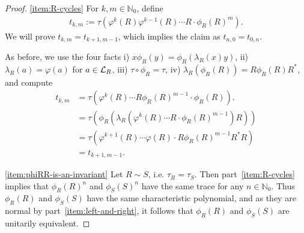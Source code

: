 \documentclass[12pt,a4paper]{amsart}
\numberwithin{equation}{section}
\theoremstyle{remark}
\newcommand{\Nl}{\mathbb{N}}
\newcommand{\la}{\lambda}
\begin{document}
\begin{proof}
     \ref{item:R-cycles} For $k,m\in\Nl_0$, define 
 \begin{align}
  t_{k,m}
  :=
  \tau(\varphi^k(R)\varphi^{k-1}(R)\cdots R\cdot\phi_R(R)^m).
 \end{align}
 We will prove $t_{k,m}=t_{k+1,m-1}$, which implies the claim as $t_{n,0}=t_{0,n}$.
 
As before, we use the four facts i) $x\phi_R(y)=\phi_R(\la_R(x)y)$, ii) $\la_R(a)=\varphi(a)$ for $a\in\mathcal{L}_R$, iii) $\tau\circ\phi_R=\tau$, iv) $\la_R(\phi_R(R))=R\phi_R(R)R^*$, and compute
 \begin{align*}
  t_{k,m}
  &=
  \tau(\varphi^k(R)\cdots R\phi_R(R)^{m-1}\cdot\phi_R(R)).
  \\
  &=
  \tau\left(\phi_R\left(\la_R\left(\varphi^k(R)\cdots R\cdot\phi_R(R)^{m-1}\right)R\right)\right)    
  \\
  &=
  \tau\left(\varphi^{k+1}(R)\cdots \varphi(R)\cdot R\phi_R(R)^{m-1}R^*R\right)    
  \\
  &=
  t_{k+1,m-1}.
 \end{align*}

 \ref{item:phiRR-is-an-invariant} Let $R\sim S$, i.e. $\tau_R=\tau_S$. Then part~\ref{item:R-cycles} implies that $\phi_R(R)^n$ and $\phi_S(S)^n$ have the same trace for any $n\in\Nl_0$. Thus $\phi_R(R)$ and $\phi_S(S)$ have the same characteristic polynomial, and as they are normal by part~\ref{item:left-and-right}, it follows that $\phi_R(R)$ and $\phi_S(S)$ are unitarily equivalent. 
\end{proof}
\end{document}
